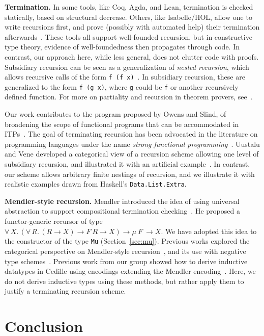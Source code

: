 \documentclass[a4paper,USenglish]{lipics-v2021}
\newcommand{\all}[2]{\forall\, #1.\, #2}
\begin{document}
\textbf{Termination.}  In some tools, like Coq, Agda, and Lean,
termination is checked statically, based on structural decrease.
Others, like Isabelle/HOL, allow one to write recursions first, and
prove (possibly with automated help) their termination
afterwards~\cite{krauss}.  These tools all support well-founded
recursion, but in constructive type theory, evidence of
well-foundedness then propagates through code.  In contrast, our
approach here, while less general, does not clutter code with proofs.
Subsidiary recursion can be seen as a generalization of \emph{nested
recursion}, which allows recursive calls of the form
\verb|f (f x)|~\cite{krauss10}.  In subsidiary recursion, these are
generalized to the form \verb|f (g x)|, where \verb|g| could be
\verb|f| or another recursively defined function.  For more on
partiality and recursion in theorem provers, see~\cite{bove+16}.

Our work contributes to the program proposed by Owens and Slind, of
broadening the scope of functional programs that can be accommodated
in ITPs~\cite{owens+08}.  The goal of terminating recursion has been
advocated in the literature on programming languages under the name
\emph{strong functional programming}~\cite{turner95}.  Uustalu and
Vene developed a categorical view of a recursion scheme allowing one
level of subsidiary recursion, and illustrated it with an artificial
example~\cite{uustalu11}.  In contrast, our scheme allows arbitrary
finite nestings of recursion, and we illustrate it with realistic
examples drawn from Haskell's \verb|Data.List.Extra|.

\textbf{Mendler-style recursion.}  Mendler introduced the idea of using
universal abstraction to support compositional termination checking~\cite{mendler91}.  He proposed a
functor-generic recursor of type $\all{X}{(\all{R}{(R \to X) \to F\ R
    \to X}) \to \mu\ F\ \to X}$. We have adopted this idea to the
constructor of the type \verb|Mu| (Section~\ref{sec:mu}).  Previous
works explored the categorical perspective on Mendler-style
recursion~\cite{uustalu99}, and its use with negative type
schemes~\cite{ahn11}.  Previous work from our group showed
how to derive inductive datatypes in Cedille using encodings
extending the Mendler encoding~\cite{firsov+18b,firsov+18a}.
Here, we do not derive inductive types using these methods,
but rather apply them to justify a terminating recursion scheme.

\section{Conclusion}
\end{document}
